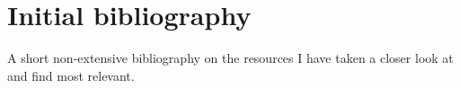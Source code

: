 \documentclass[11pt,fleqn,twoside]{article}
\begin{document}
\section{Initial bibliography}
A short non-extensive bibliography on the resources I have taken a closer look at and find most relevant.

\nocite{CCrassinThesis}
\nocite{GPUAccelTech}
\nocite{GPUGemsCh39}
\nocite{CodermindArts}

\nocite{Volreen}
\nocite{Voxlap}
\nocite{PolyVox}
\nocite{Field3D}


\renewcommand{\refname}{}  %
\end{document}
